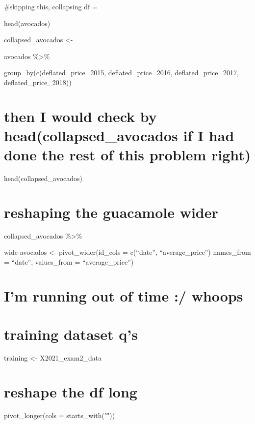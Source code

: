 \documentclass[
]{article}
\begin{document}
\#skipping this, collapsing df =

head(avocados)

collapsed\_avocados \textless-

avocados \%\textgreater\%

group\_by(c(deflated\_price\_2015, deflated\_price\_2016,
deflated\_price\_2017, deflated\_price\_2018))

\hypertarget{then-i-would-check-by-headcollapsed_avocados-if-i-had-done-the-rest-of-this-problem-right}{%
\section{then I would check by head(collapsed\_avocados if I had done
the rest of this problem
right)}\label{then-i-would-check-by-headcollapsed_avocados-if-i-had-done-the-rest-of-this-problem-right}}

head(collapsed\_avocados)

\hypertarget{reshaping-the-guacamole-wider}{%
\section{reshaping the guacamole
wider}\label{reshaping-the-guacamole-wider}}

collapsed\_avocados \%\textgreater\%

wide avocados \textless- pivot\_wider(id\_cols = c(``date'',
``average\_price'') names\_from = ``date'', values\_from =
``average\_price'')

\hypertarget{im-running-out-of-time-whoops}{%
\section{I'm running out of time :/
whoops}\label{im-running-out-of-time-whoops}}

\hypertarget{training-dataset-qs}{%
\section{training dataset q's}\label{training-dataset-qs}}

training \textless- X2021\_exam2\_data

\hypertarget{reshape-the-df-long}{%
\section{reshape the df long}\label{reshape-the-df-long}}

pivot\_longer(cols = starts\_with(""))
\end{document}
